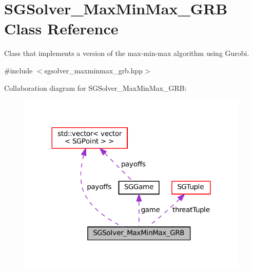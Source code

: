 \hypertarget{classSGSolver__MaxMinMax__GRB}{}\section{S\+G\+Solver\+\_\+\+Max\+Min\+Max\+\_\+\+G\+RB Class Reference}
\label{classSGSolver__MaxMinMax__GRB}


Class that implements a version of the max-\/min-\/max algorithm using Gurobi.  




{\ttfamily \#include $<$sgsolver\+\_\+maxminmax\+\_\+grb.\+hpp$>$}



Collaboration diagram for S\+G\+Solver\+\_\+\+Max\+Min\+Max\+\_\+\+G\+RB\+:
\nopagebreak
\begin{figure}[H]
\begin{center}
\leavevmode
\includegraphics[width=311pt]{classSGSolver__MaxMinMax__GRB__coll__graph}
\end{center}
\end{figure}
